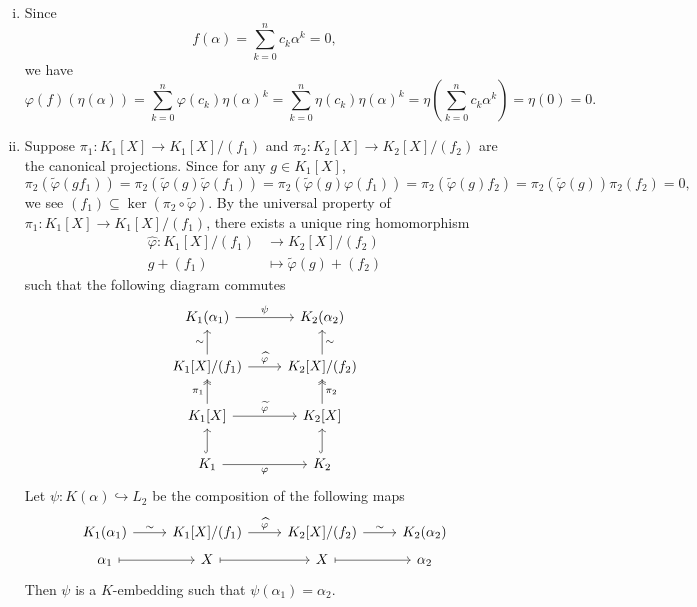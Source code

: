 \begin{prf}
    \begin{enumerate}[(i)]
        \item Since
        \[
            f(\alpha)=\sum_{k=0}^n c_k\alpha^k=0,
        \]
        we have
        \[
            \varphi(f)(\eta(\alpha))=\sum_{k=0}^n \varphi(c_k)\eta(\alpha)^k=\sum_{k=0}^n \eta(c_k)\eta(\alpha)^k=\eta\left(\sum_{k=0}^n c_k\alpha^k\right)=\eta(0)=0.
        \]
        \item Suppose $\pi_1:K_1[X]\to K_1[X]/(f_1)$ and $\pi_2:K_2[X]\to K_2[X]/(f_2)$ are the canonical projections. Since for any $g\in K_1[X]$, 
        \[
        \pi_2(\widetilde{\varphi}(gf_1))=\pi_2(\widetilde{\varphi}(g)\widetilde{\varphi}(f_1))=\pi_2(\widetilde{\varphi}(g)\varphi(f_1))=\pi_2(\widetilde{\varphi}(g)f_2)=\pi_2(\widetilde{\varphi}(g))\pi_2(f_2)=0,
        \]
        we see $(f_1)\subseteq \ker (\pi_2\circ \widetilde{\varphi})$. By the universal property of $\pi_1:K_1[X]\to K_1[X]/(f_1)$, there exists a unique ring homomorphism 
        \begin{align*}
            \widehat{\varphi}:K_1[X]/(f_1)&\longrightarrow K_2[X]/(f_2)\\
            g+(f_1)&\longmapsto \widetilde{\varphi}(g)+(f_2)
        \end{align*}
        such that the following diagram commutes
        \[
            \begin{tikzcd}
                K_1(\alpha_1) \arrow[r, "\psi"]                                         & K_2(\alpha_2)                           \\
                {K_1[X]/(f_1)} \arrow[r, "\widehat{\varphi}"] \arrow[u, "\sim"]         & {K_2[X]/(f_2)} \arrow[u, "\sim"']       \\
                {K_1[X]} \arrow[u, "\pi_1", two heads] \arrow[r, "\widetilde{\varphi}"] & {K_2[X]} \arrow[u, "\pi_2"', two heads] \\
                K_1 \arrow[r, "\varphi"'] \arrow[u, hook]                               & K_2 \arrow[u, hook]                    
            \end{tikzcd}
        \]
        Let $\psi:K(\alpha)\hookrightarrow L_2$ be the composition of the following maps
        \[
        \begin{tikzcd}
            K_1(\alpha_1) \arrow[r, "\sim"] & K_1[X]/(f_1) \arrow[r, "\widehat{\varphi}"] & K_2[X]/(f_2)\arrow[r,"{\sim}"] &  K_2(\alpha_2)\\[-1.5em]
            \alpha_1 \arrow[r, mapsto] & X \arrow[r, mapsto] & X \arrow[r, mapsto] & \alpha_2
        \end{tikzcd}
        \]
        Then $\psi$ is a $K$-embedding such that $\psi(\alpha_1)=\alpha_2$. 
    \end{enumerate}
\end{prf}

